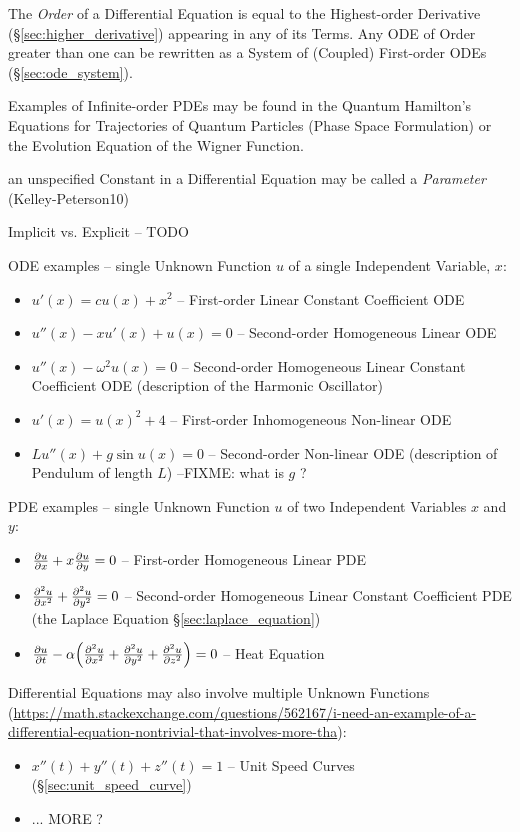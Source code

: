 The \emph{Order} of a Differential Equation is equal to the Highest-order
Derivative (\S\ref{sec:higher_derivative}) appearing in any of its Terms. Any
ODE of Order greater than one can be rewritten as a System of (Coupled)
First-order ODEs (\S\ref{sec:ode_system}).

Examples of Infinite-order PDEs may be found in the Quantum Hamilton's Equations
for Trajectories of Quantum Particles (Phase Space Formulation) or the Evolution
Equation of the Wigner Function.

an unspecified Constant in a Differential Equation may be called a
\emph{Parameter} (Kelley-Peterson10)

Implicit vs. Explicit -- TODO

ODE examples -- single Unknown Function $u$ of a single Independent Variable,
$x$:
\begin{itemize}
\item $u'(x) = cu(x) + x^2$ -- First-order Linear Constant Coefficient ODE
\item $u''(x) - xu'(x) + u(x) = 0$ -- Second-order Homogeneous Linear ODE
\item $u''(x) - \omega^2u(x) = 0$ -- Second-order Homogeneous Linear Constant
  Coefficient ODE (description of the Harmonic Oscillator)
\item $u'(x) = u(x)^2 + 4$ -- First-order Inhomogeneous Non-linear ODE
\item $Lu''(x) + g\sin{u(x)} = 0$ -- Second-order Non-linear ODE (description of
  Pendulum of length $L$) --FIXME: what is $g$ ?
\end{itemize}

PDE examples -- single Unknown Function $u$ of two Independent Variables $x$ and
$y$:
\begin{itemize}
\item $\frac{\partial{u}}{\partial{x}} + x\frac{\partial{u}}{\partial{y}} = 0$ -- First-order Homogeneous Linear PDE
\item $\frac{\partial{^2u}}{\partial{x^2}} + \frac{\partial{^2u}}{\partial{y^2}} = 0$ -- Second-order Homogeneous
  Linear Constant Coefficient PDE (the Laplace Equation
  \S\ref{sec:laplace_equation})
\item $\frac{\partial{u}}{\partial{t}} - \alpha\Big(
      \frac{\partial{^2u}}{\partial{x^2}} + \frac{\partial{^2u}}{\partial{y^2}} + \frac{\partial{^2u}}{\partial{z^2}}
    \Big) = 0$ -- Heat Equation
\end{itemize}

Differential Equations may also involve multiple Unknown Functions
(\url{https://math.stackexchange.com/questions/562167/i-need-an-example-of-a-differential-equation-nontrivial-that-involves-more-tha}):
\begin{itemize}
  \item $x''(t) + y''(t) + z''(t) = 1$ -- Unit Speed Curves
    (\S\ref{sec:unit_speed_curve})
  \item ... MORE ?
\end{itemize}

